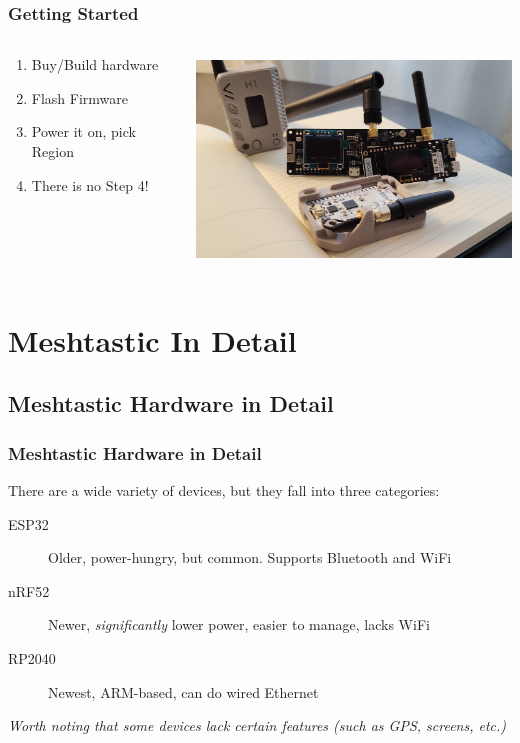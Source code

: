 \documentclass[aspectratio=169]{beamer}
\begin{document}
\begin{frame}[fragile]
  \frametitle{Getting Started}
  \begin{columns}[]
    \begin{column}[T]{0.35\paperwidth}
      \begin{enumerate}%
        \item{Buy/Build hardware}
        \item{Flash Firmware}
        \item{Power it on, pick Region}
        \item{There is no Step 4!}
      \end{enumerate}
    \end{column}
    \begin{column}[T]{0.55\paperwidth}
      \includegraphics[height=5.5cm,keepaspectratio]{images/boards.jpg}
    \end{column}
  \end{columns}
\end{frame}

\section{Meshtastic In Detail}
\subsection{Meshtastic Hardware in Detail}
\begin{frame}[fragile]
  \frametitle{Meshtastic Hardware in Detail}
  There are a wide variety of devices, but they fall into three categories:
  \begin{description}%
    \item[ESP32]{Older, power-hungry, but common. Supports Bluetooth and WiFi}
    \item[nRF52]{Newer, \emph{significantly} lower power, easier to manage, lacks WiFi}
    \item[RP2040]{Newest, ARM-based, can do wired Ethernet}
  \end{description}
  \vfill{}
  \emph{Worth noting that some devices lack certain features (such as GPS, screens, etc.)}
\end{frame}
\end{document}
